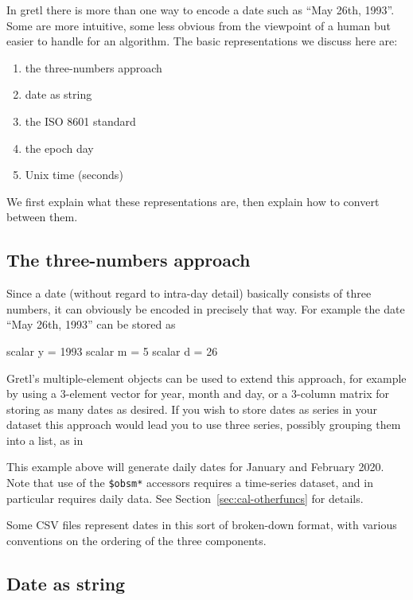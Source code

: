 In gretl there is more than one way to encode a date such as ``May
26th, 1993''. Some are more intuitive, some less obvious from the
viewpoint of a human but easier to handle for an algorithm. The basic
representations we discuss here are:
\begin{enumerate}
\item the three-numbers approach
\item date as string
\item the ISO 8601 standard
\item the epoch day
\item Unix time (seconds)
\end{enumerate}
We first explain what these representations are, then explain how
to convert between them.

\subsection{The three-numbers approach}
\label{sec:cal-3numbers}

Since a date (without regard to intra-day detail) basically consists
of three numbers, it can obviously be encoded in precisely that way.
For example the date ``May 26th, 1993'' can be stored as
\begin{code}
  scalar y = 1993
  scalar m = 5
  scalar d = 26
\end{code}

Gretl's multiple-element objects can be used to extend this approach,
for example by using a 3-element vector for year, month and day, or a
3-column matrix for storing as many dates as desired. If you wish to
store dates as series in your dataset this approach would lead you to
use three series, possibly grouping them into a list, as in
This example above will generate daily dates for January and February
2020. Note that use of the \verb|$obsm*| accessors requires a
time-series dataset, and  in particular requires
daily data. See Section~\ref{sec:cal-otherfuncs} for details.

Some CSV files represent dates in this sort of broken-down format,
with various conventions on the ordering of the three components.

\subsection{Date as string}
\label{sec:cal-generic-string}

